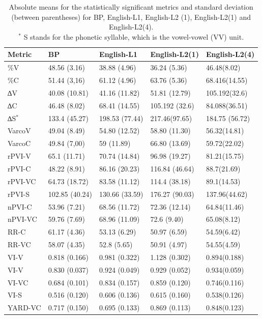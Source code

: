\begin{table}
\caption{Absolute means for the statistically significant metrics and standard
deviation (between parentheses) for BP, English-L1, English-L2 (1),
English-L2(1) and English-L2(4).\\$^\ast$ S stands for the phonetic syllable, which is the  vowel-vowel (VV) unit.}\label{leo-tab03}
\begin{small}
\begin{tabular}{@{}lllll@{}}
\toprule
Metric & BP & English-L1 & English-L2(1) & English-L2(4) \\
\midrule
\%V & 48.56 (3.16) & 38.88 (4.96) & 36.24 (5.36) & 46.48(8.02) \\
\%C & 51.44 (3,16) & 61.12 (4.96) & 63.76 (5.36) & 68.416(14.55) \\
∆V & 40.08 (10.81) & 41.16 (11.82) & 51.81 (12.79) & 105.192(32.6) \\
∆C & 46.48 (8.02) & 68.41 (14.55) & 105.192 (32.6) & 84.088(36.51) \\
∆S$^\ast$ & 133.4 (45.27) & 198.53 (77.44) & 217.46(97.65) & 184.75 (56.72) \\
VarcoV & 49.04 (8.49) & 54.80 (12.52) & 58.80 (11.30) & 56.32(14.81) \\
VarcoC & 49.84 (7,00) & 59 (11.89) & 66.80 (13.69) & 59.72(22.02) \\
rPVI-V & 65.1 (11.71) & 70.74 (14.84) & 96.98 (19.27) & 81.21(15.75) \\
rPVI-C & 48.22 (8.91) & 86.16 (20.23) & 116.84 (46.64) & 88.7(21.69) \\
rPVI-VC & 64.73 (18.72) & 83.58 (11.12) & 114.4 (38.18) & 89.1(14.53) \\
rPVI-S & 102.85 (40.24) & 130.66 (33.59) & 176.27 (90.03) & 137.96(44.62) \\
nPVI-C & 53.96 (7.21) & 68.56 (11.72) & 72.36 (12.14) & 64.84(11.46) \\
nPVI-VC & 59.76 (7.69) & 68.96 (11.09) & 72.6 (9.40) & 65.08(8.12) \\
RR-C & 61.17 (4.36) & 53.13 (6.29) & 50.97 (6.59) & 54.59(6.42) \\
RR-VC & 58.07 (4.35) & 52.8 (5.65) & 50.91 (4.97) & 54.55(4.59) \\
VI-V & 0.818 (0.166) & 0.981 (0.322) & 1.128 (0.302) & 0.894(0.188) \\
VI-V & 0.830 (0.037) & 0.924 (0.049) & 0.929 (0.052) & 0.934(0.059) \\
VI-VC & 0.684 (0.101) & 0.834 (0.157) & 0.859 (0.120) & 0.746(0.116) \\
VI-S & 0.516 (0.120) & 0.606 (0.136) & 0.615 (0.160) & 0.538(0.126) \\
YARD-VC & 0.717 (0.150) & 0.695 (0.133) & 0.869 (0.113) & 0.848(0.123) \\
\bottomrule
\end{tabular}
\end{small}
\end{table}

